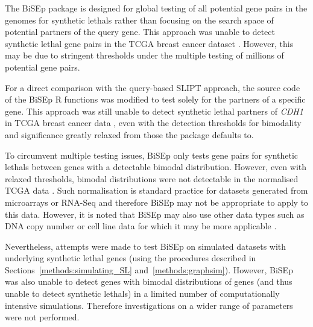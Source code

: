 The \gls{BiSEp} package is designed for global testing of all potential gene pairs in the \glspl{genome} for \glspl{synthetic lethal} rather than focusing on the search space of  potential partners of the query gene. This approach was unable to detect \gls{synthetic lethal} gene pairs in the \gls{TCGA} breast cancer  dataset \citep{TCGA2012}. However, this may be due to stringent thresholds under the multiple testing of millions of potential gene pairs.

For a direct comparison with the query-based \gls{SLIPT} approach, the source code of the \gls{BiSEp} R functions was modified to test solely for the partners of a specific gene. This approach was still unable to detect \gls{synthetic lethal} partners of \textit{CDH1} in \gls{TCGA} breast cancer  data \citep{TCGA2012}, even with the detection thresholds for bimodality and significance greatly relaxed from those the package defaults to.

To circumvent multiple testing issues, \gls{BiSEp} only tests gene pairs for \glspl{synthetic lethal} between genes with a detectable bimodal distribution. However, even with relaxed thresholds, bimodal distributions were not detectable in the normalised \gls{TCGA} data \citep{TCGA2012}. Such normalisation \cite{limma} is standard practice for  datasets generated from \glspl{microarray} or \gls{RNA-Seq} and therefore \gls{BiSEp} may not be appropriate to apply to this data. However, it is noted that \gls{BiSEp} may also use other data types such as \acrshort{DNA} copy number or cell line data for which it may be more applicable \citep{Wappett2016}.

Nevertheless, attempts were made to test \gls{BiSEp} on simulated datasets with underlying \gls{synthetic lethal} genes (using the procedures described in Sections~\ref{methods:simulating_SL} and~\ref{methods:graphsim}). However, \gls{BiSEp} was also unable to detect genes with bimodal distributions of genes (and thus unable to detect \glspl{synthetic lethal}) in a limited number of computationally intensive simulations. Therefore investigations on a wider range of parameters were not performed.


\iffalse


